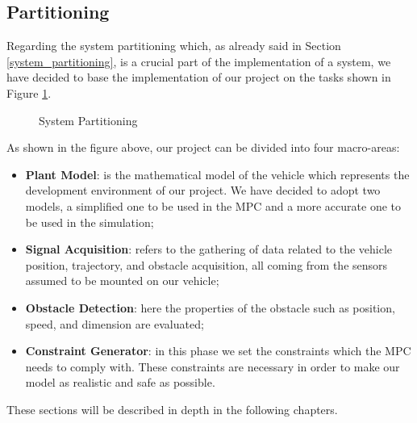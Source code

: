\subsection{Partitioning} \label{partitioning_subsection}

Regarding the system partitioning which, as already said in Section \ref{system_partitioning}, is a crucial part of the implementation of a system, we have decided to base the implementation of our project on the tasks shown in Figure \ref{fig:partitioning}.

\begin{figure}[H]
    \centering
    \caption{System Partitioning}
    \label{fig:partitioning}
\end{figure}

As shown in the figure above, our project can be divided into four macro-areas:
\begin{itemize}
    \item \textbf{Plant Model}: is the mathematical model of the vehicle which represents the development environment of our project. We have decided to adopt two models, a simplified one to be used in the MPC and a more accurate one to be used in the simulation; 
    \item \textbf{Signal Acquisition}: refers to the gathering of data related to the vehicle position, trajectory, and obstacle acquisition, all coming from the sensors assumed to be mounted on our vehicle;
    \item \textbf{Obstacle Detection}: here the properties of the obstacle such as position, speed, and dimension  are evaluated;
    \item \textbf{Constraint Generator}: in this phase we set the constraints which the MPC needs to comply with. These constraints are necessary in order to make our model as realistic and safe as possible.
\end{itemize}

These sections will be described in depth in the following chapters.




